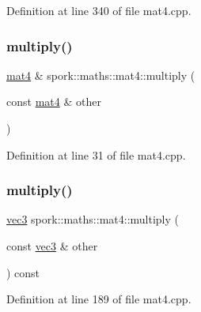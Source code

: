 Definition at line 340 of file mat4.\+cpp.

\mbox{\label{structspork_1_1maths_1_1mat4_a68bddd1d0d1f9a512138161230d53d48}} 
\subsubsection{\texorpdfstring{multiply()}{multiply()}\hspace{0.1cm}{\footnotesize\ttfamily [1/3]}}
{\footnotesize\ttfamily \hyperlink{structspork_1_1maths_1_1mat4}{mat4} \& spork\+::maths\+::mat4\+::multiply (\begin{DoxyParamCaption}\item[{const \hyperlink{structspork_1_1maths_1_1mat4}{mat4} \&}]{other }\end{DoxyParamCaption})}



Definition at line 31 of file mat4.\+cpp.

\mbox{\label{structspork_1_1maths_1_1mat4_aca8372b7cd3bbffd3fdabde5bc4c8cde}} 
\subsubsection{\texorpdfstring{multiply()}{multiply()}\hspace{0.1cm}{\footnotesize\ttfamily [2/3]}}
{\footnotesize\ttfamily \hyperlink{structspork_1_1maths_1_1vec3}{vec3} spork\+::maths\+::mat4\+::multiply (\begin{DoxyParamCaption}\item[{const \hyperlink{structspork_1_1maths_1_1vec3}{vec3} \&}]{other }\end{DoxyParamCaption}) const}



Definition at line 189 of file mat4.\+cpp.

\mbox{\label{structspork_1_1maths_1_1mat4_ab57d988ef0f1b080045b936668875dd6}} 

